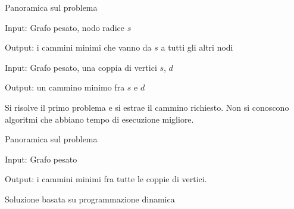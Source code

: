 \begin{frame}{Panoramica sul problema}

\vspace{-9pt}
\begin{myboxtitle}
\BI
\item \alert{Input}: Grafo pesato, nodo radice $s$ 
\item \alert{Output}: i cammini minimi che vanno da $s$ a tutti gli altri nodi
\EI
\end{myboxtitle}

\begin{myboxtitle}
\BI
\item \alert{Input}: Grafo pesato, una coppia di vertici $s$, $d$
\item \alert{Output}: un cammino minimo fra $s$ e $d$
\item Si risolve il primo problema e si estrae il cammino richiesto. 
Non si conoscono algoritmi che abbiano tempo di esecuzione migliore.
\EI
\end{myboxtitle}

\end{frame}

\begin{frame}{Panoramica sul problema}

\vspace{-9pt}
\begin{myboxtitle}
\BI
\item \alert{Input}: Grafo pesato
\item \alert{Output}: i cammini minimi fra tutte le coppie di vertici. 
\item Soluzione basata su programmazione dinamica		
\EI
\end{myboxtitle}

\end{frame}

